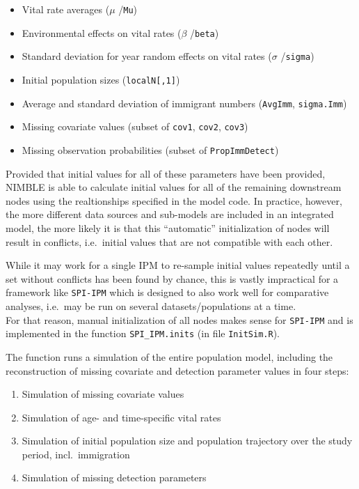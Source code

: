 \documentclass[
]{book}
\providecommand{\tightlist}{%
  \setlength{\itemsep}{0pt}\setlength{\parskip}{0pt}}
\begin{document}
\begin{itemize}
\tightlist
\item
  Vital rate averages (\(\mu\) /\texttt{Mu})
\item
  Environmental effects on vital rates (\(\beta\) /\texttt{beta})
\item
  Standard deviation for year random effects on vital rates (\(\sigma\) /\texttt{sigma})
\item
  Initial population sizes (\texttt{localN{[},1{]}})
\item
  Average and standard deviation of immigrant numbers (\texttt{AvgImm}, \texttt{sigma.Imm})
\item
  Missing covariate values (subset of \texttt{cov1}, \texttt{cov2}, \texttt{cov3})
\item
  Missing observation probabilities (subset of \texttt{PropImmDetect})
\end{itemize}

Provided that initial values for all of these parameters have been provided,
NIMBLE is able to calculate initial values for all of the remaining downstream
nodes using the realtionships specified in the model code. In practice, however,
the more different data sources and sub-models are included in an integrated
model, the more likely it is that this ``automatic'' initialization of nodes will
result in conflicts, i.e.~initial values that are not compatible with each other.

While it may work for a single IPM to re-sample initial values repeatedly until
a set without conflicts has been found by chance, this is vastly impractical for
a framework like \texttt{SPI-IPM} which is designed to also work well for comparative
analyses, i.e.~may be run on several datasets/populations at a time.\\
For that reason, manual initialization of all nodes makes sense for \texttt{SPI-IPM} and
is implemented in the function \texttt{SPI\_IPM.inits} (in file \texttt{InitSim.R}).

The function runs a simulation of the entire population model, including the
reconstruction of missing covariate and detection parameter values in four
steps:

\begin{enumerate}
\def\labelenumi{\arabic{enumi}.}
\tightlist
\item
  Simulation of missing covariate values
\item
  Simulation of age- and time-specific vital rates
\item
  Simulation of initial population size and population trajectory over the study period, incl.~immigration
\item
  Simulation of missing detection parameters
\end{enumerate}
\end{document}
